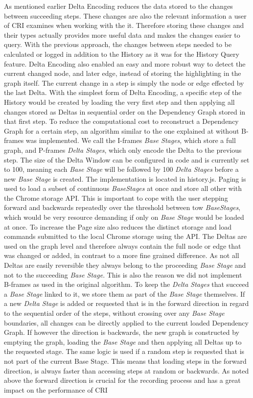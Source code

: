 As mentioned earlier Delta Encoding reduces the data stored to the changes between succeeding steps. These changes are also the relevant information a user of CRI examines when working with the it. Therefore storing these changes and their types actually provides more useful data and makes the changes easier to query. With the previous approach, the changes between steps needed to be calculated or logged in addition to the History as it was for the History Query feature. Delta Encoding also enabled an easy and more robust way to detect the current changed node, and later edge, instead of storing the highlighting in the graph itself. The current change in a step is simply the node or edge effected by the last Delta. With the simplest form of Delta Encoding, a specific step of the History would be created by loading the very first step and then applying all changes stored as Deltas in sequential order on the Dependency Graph stored in that first step. To reduce the computational cost to reconstruct a Dependency Graph for a certain step, an algorithm similar to the one explained at \cite{VideoEncoding} without B-frames was implemented. We call the I-frames \emph{Base Stages}, which store a full graph, and P-frames \emph{Delta Stages}, which only encode the Delta to the previous step. The size of the Delta Window can be configured in code and is currently set to 100, meaning each \emph{Base Stage} will be followed by 100 \emph{Delta Stages} before a new \emph{Base Stage} is created. The implementation is located in history.js. Paging is used to load a subset of continuous \emph{BaseStages} at once and store all other with the Chrome storage API. This is important to cope with the user stepping forward and backwards repeatedly over the threshold between tow \emph{BaseStages}, which would be very resource demanding if only on \emph{Base Stage} would be loaded at once. To increase the Page size also reduces the distinct storage and load commands submitted to the local Chrome storage using the API. The Deltas are used on the graph level and therefore always contain the full node or edge that was changed or added, in contrast to a more fine grained difference. As not all Deltas are easily reversible they always belong to the proceeding \emph{Base Stage} and not to the succeeding \emph{Base Stage}. This is also the reason we did not implement B-frames as used in the original algorithm. To keep the \emph{Delta Stages} that succeed a \emph{Base Stage} linked to it, we store them as part of the \emph{Base Stage} themselves. If a new \emph{Delta Stage} is added or requested that is in the forward direction in regard to the sequential order of the steps, without crossing over any \emph{Base Stage} boundaries, all changes can be directly applied to the current loaded Dependency Graph. If however the direction is backwards, the new graph is constructed by emptying the graph, loading the \emph{Base Stage} and then applying all Deltas up to the requested stage. The same logic is used if a random step is requested that is not part of the current Base Stage. This means that loading steps in the forward direction, is always faster than accessing steps at random or backwards. As noted above the forward direction is crucial for the recording process and has a great impact on the performance of CRI 